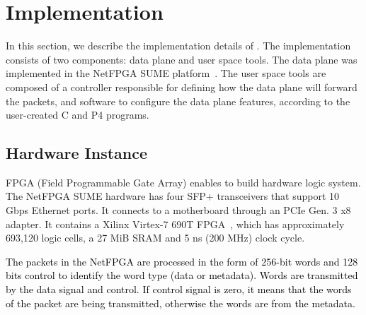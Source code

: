 \section{Implementation}
\label{sec:implementation}

In this section, we describe the implementation details of \system.
The implementation consists of two components: data plane and user space tools. 
The data plane was implemented in the NetFPGA SUME platform~\cite{SUME2014}.
The user space tools are composed of a controller responsible for defining how the data plane will forward the packets, and software to configure the data plane features, according to the user-created C and P4 programs.


\subsection{Hardware Instance}

FPGA (Field Programmable Gate Array) enables to build hardware logic system.
The NetFPGA SUME hardware has four SFP+ transceivers that support 10 Gbps Ethernet ports.
It connects to a motherboard through an PCIe Gen. 3 x8 adapter.
It contains a Xilinx Virtex-7 690T FPGA~\cite{Virtex7},
which has approximately 693,120 logic cells, a 27 MiB SRAM and 5 ns (200 MHz) clock cycle.

\textcolor{black}{The packets in the NetFPGA are processed in the form of 256-bit words and 128 bits control to identify the word type (data or metadata). Words are transmitted by the data signal and control. If control signal is zero, it means that the words of the packet are being transmitted, otherwise the words are from the metadata.}




